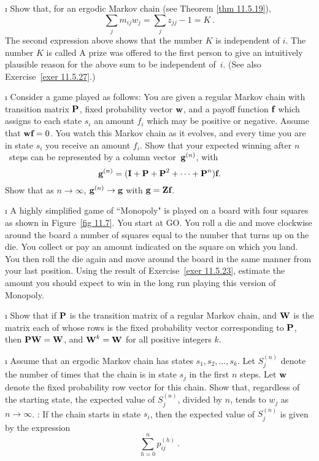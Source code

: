 \begin{LJSItem}
\i\label{exer 11.5.22} Show that, for an ergodic Markov chain (see Theorem
 \ref{thm 11.5.19}),
$$
\sum_j m_{ij} w_j = \sum_j z_{jj} - 1 = K\ .
$$
The second expression above shows that the number $K$ is independent of $i$. 
The
number $K$ is called   A
prize was offered to the
first  person to give an intuitively plausible reason for the above sum to be
independent
of~$i$.  (See also Exercise~\ref{exer 11.5.27}.)

\i\label{exer 11.5.23} Consider a game played as follows: You are given a
regular Markov chain
with transition matrix
${\mbox{\bf P}\/}$, fixed probability vector ${\mbox{\bf w}\/}$, and a payoff function ${\mbox{\bf f}\/}$
which assigns to each
state $s_i$ an amount $f_i$ which may be positive or negative.  Assume that
${\mbox{\bf w}\/}{\mbox{\bf f}\/} =
0$.  You watch this Markov chain as it evolves, and every time you are in state
$s_i$ you receive an amount
$f_i$.  Show that your expected winning after
$n$~steps can be represented by a column vector~${\mbox{\bf g}\/}^{(n)}$,  with
$${\mbox{\bf g}\/}^{(n)} = ({\mbox{\bf I}\/} + {\mbox{\bf P}\/} + {\mbox{\bf P}\/}^2 +\cdots+ {\mbox{\bf P}\/}^n)
{\mbox{\bf f}\/}.$$ Show that as $n \to
\infty$, ${\mbox{\bf g}\/}^{(n)} \to {\mbox{\bf g}\/}$  with ${\mbox{\bf g}\/} = {\mbox{\bf Z}\/} {\mbox{\bf f}\/}$.
 
\i\label{exer 11.5.24} A highly simplified game of ``Monopoly" is played on a 
board with four squares as shown in Figure~\ref{fig 11.7}.
You start at GO.  You roll a die and move clockwise around the board a number
of squares equal to the number that turns up on the die.  You collect or pay an
amount indicated on the square on which you land.  You then roll the die again
and move around the board in the same manner from your last position. Using the
result of 
Exercise~\ref{exer 11.5.23}, estimate the amount you should expect to win in
the long run
playing this version of Monopoly.

 
\i\label{exer 11.5.28} Show that if ${\mbox{\bf P}\/}$ is the transition matrix of a
regular Markov
chain, and ${\mbox{\bf W}\/}$ is the matrix each of whose rows is the fixed probability
vector
corresponding to ${\mbox{\bf P}\/}$, then ${\mbox{\bf P}\/}{\mbox{\bf W}\/} = {\mbox{\bf W}\/}$, and ${\mbox{\bf W}\/}^k = {\mbox{\bf W}\/}$
for all positive integers $k$.

\i\label{exer 11.5.29} Assume that an ergodic Markov chain has states $s_1,
s_2, \ldots,
s_k$.  Let $S^{(n)}_j$ denote the number of times that the chain is in state
$s_j$ in the
first $n$ steps.  Let ${\mbox{\bf w}\/}$ denote the fixed probability row vector for
this chain.  Show
that, regardless of the starting state, the expected value of $S^{(n)}_j$,
divided by $n$,
tends to $w_j$ as $n \rightarrow \infty$.  :  If the chain starts in
state
$s_i$, then the expected value of $S^{(n)}_j$ is given by the expression
$$\sum_{h = 0}^n p^{(h)}_{ij}\ .$$


\end{LJSItem}
